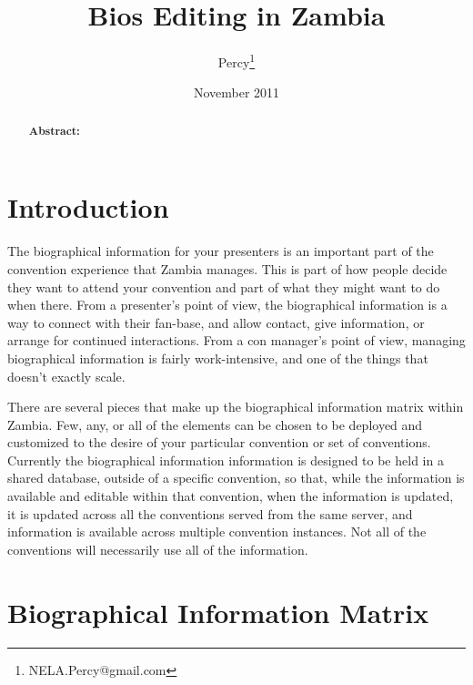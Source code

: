 \documentclass[captions=tablesignature]{scrartcl}
\author{Percy\thanks{NELA.Percy@gmail.com}}
\date{November 2011}
\title{Bios Editing in Zambia}
\begin{document}
\maketitle
{}
\thispagestyle{fancy}
\renewcommand{\headrulewidth}{0pt}
\renewcommand{\footrulewidth}{0pt}
\lhead{}
\rhead{}
\chead{}
\lfoot{}
\cfoot{}
\rfoot{}
\begin{abstract}
\vspace{5cm}
{\LARGE{\textbf{Abstract:\\}}}

\end{abstract}
\newpage
\renewcommand{\headrulewidth}{1pt}
\renewcommand{\footrulewidth}{1pt}
\rfoot{\thepage}
\setcounter{tocdepth}{3}
\tableofcontents
\listoftables
\newpage
{}
\section{Introduction}
\label{sec-1}

The biographical information for your presenters is an important
part of the convention experience that Zambia manages.  This is part
of how people decide they want to attend your convention and part of
what they might want to do when there.  From a presenter's point of
view, the biographical information is a way to connect with their
fan-base, and allow contact, give information, or arrange for
continued interactions.  From a con manager's point of view,
managing biographical information is fairly work-intensive, and one
of the things that doesn't exactly scale.

There are several pieces that make up the biographical information
matrix within Zambia.  Few, any, or all of the elements can be
chosen to be deployed and customized to the desire of your
particular convention or set of conventions.  Currently the
biographical information information is designed to be held in a
shared database, outside of a specific convention, so that, while
the information is available and editable within that convention,
when the information is updated, it is updated across all the
conventions served from the same server, and information is
available across multiple convention instances.  Not all of the
conventions will necessarily use all of the information.

\section{Biographical Information Matrix}
\label{sec-2}
\end{document}
